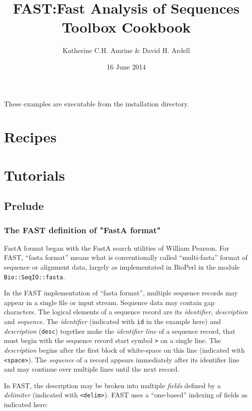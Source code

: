 \documentclass[11pt]{article}
\begin{document}
\title{FAST:Fast Analysis of Sequences Toolbox Cookbook}
\author{Katherine C.H. Amrine \& David H. Ardell}
\date{16 June 2014}
\maketitle

\setcounter{tocdepth}{5}
\tableofcontents
\vspace*{1cm}
These examples are executable from the installation directory.


\section{Recipes}
\label{sec-1}
\section{Tutorials}
\label{sec-2}
\subsection{Prelude}
\label{sec-2_1}
\subsubsection{The FAST definition of "FastA format"}
\label{sec-2_1_1}


FastA format began with the FastA search utilities of William
Pearson. For FAST, ``fasta format'' means what is conventionally called
``multi-fasta'' format of sequence or alignment data, largely as
implementated in BioPerl in the module \texttt{Bio::SeqIO::fasta}. 

In the FAST implementation of ``fasta format'', multiple sequence
records may appear in a single file or input stream. Sequence data may
contain gap characters. The logical elements of a sequence record are
its \emph{identifier}, \emph{description} and \emph{sequence}. The \emph{identifier}
(indicated with \texttt{id} in the example here) and \emph{description} (\texttt{desc})
together make the \emph{identifier line} of a sequence record, that must
begin with the sequence record start symbol \texttt{>} on a single line. The
\emph{description} begins after the first block of white-space on this line
(indicated with \texttt{<space>}). The \emph{sequence} of a record
appears immediately after its identifier line and may continue over
multiple lines until the next record. 

In FAST, the description may be broken into multiple \emph{fields} defined
by a \emph{delimiter} (indicated with \texttt{<delim>}). FAST uses a ``one-based''
indexing of fields as indicated here:
\end{document}

